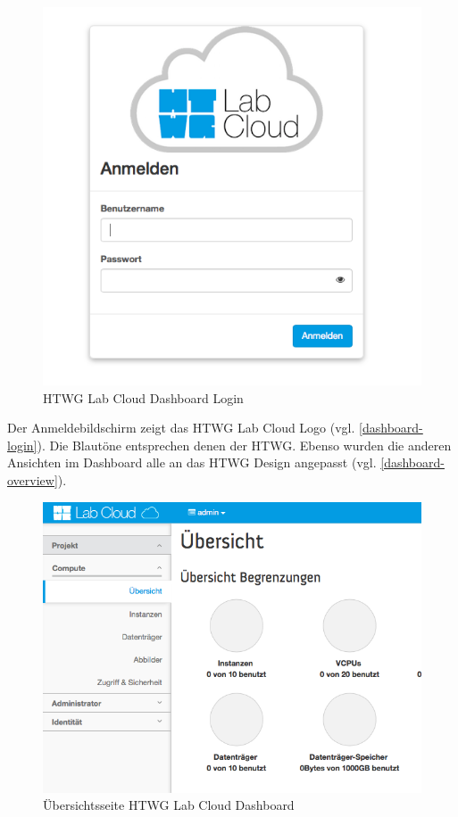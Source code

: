 \begin{figure}[H]
\centering
\includegraphics[scale=0.38]{img/dashboard-login.png}
\caption{HTWG Lab Cloud Dashboard Login}
\label{dashboard-login}
\end{figure}

Der Anmeldebildschirm zeigt das HTWG Lab Cloud Logo (vgl. \autoref{dashboard-login}).
Die Blautöne entsprechen denen der HTWG.
Ebenso wurden die anderen Ansichten im Dashboard alle an das HTWG Design angepasst (vgl. \autoref{dashboard-overview}).

\begin{figure}[H]
\centering
\includegraphics[scale=0.43]{img/dashboard-overview.png}
\caption{Übersichtsseite HTWG Lab Cloud Dashboard}
\label{dashboard-overview}
\end{figure}

